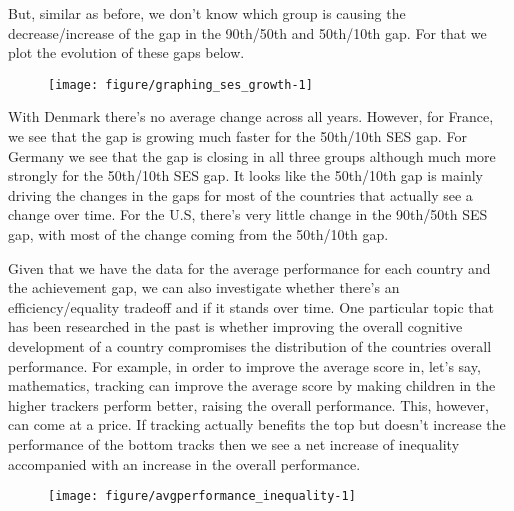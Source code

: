 \documentclass[11pt, a4paper]{article}\usepackage[]{graphicx}\usepackage[]{color}
\begin{document}
But, similar as before, we don't know which group is causing the decrease/increase of the gap in the 90th/50th and 50th/10th gap. For that we plot the evolution of these gaps below.

\begin{figure}
\begin{center}


{\centering \texttt{[image: figure/graphing\_ses\_growth-1]} 

}



\end{center}
\end{figure}

With Denmark there's no average change across all years. However, for France, we see that the gap is growing much faster for the 50th/10th SES gap. For Germany we see that the gap is closing in all three groups although much more strongly for the 50th/10th SES gap. It looks like the 50th/10th gap is mainly driving the changes in the gaps for most of the countries that actually see a change over time.  For the U.S, there's very little change in the 90th/50th SES gap, with most of the change coming from the 50th/10th gap.

Given that we have the data for the average performance for each country and the achievement gap, we can also investigate whether there's an efficiency/equality tradeoff and if it stands over time. One particular topic that has been researched in the past is whether improving the overall cognitive development of a country compromises the distribution of the countries overall performance. For example, in order to improve the average score in, let's say, mathematics, tracking can improve the average score by making children in the higher trackers perform better, raising the overall performance. This, however, can come at a price. If tracking actually benefits the top but doesn't increase the performance of the bottom tracks then we see a net increase of inequality accompanied with an increase in the overall performance.





\begin{figure}
\begin{center}


{\centering \texttt{[image: figure/avgperformance\_inequality-1]} 

}



\end{center}
\end{figure}
\end{document}

